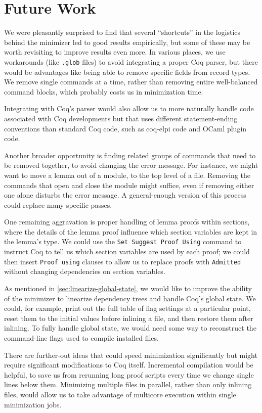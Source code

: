 \documentclass[a4paper,USenglish,cleveref,autoref,thm-restate,pdfa]{lipics-v2021}
\begin{document}
\section{Future Work}\label{sec:future-work}

We were pleasantly surprised to find that several ``shortcuts'' in the logistics behind the minimizer led to good results empirically, but some of these may be worth revisiting to improve results even more.
In various places, we use workarounds (like \texttt{.glob} files) to avoid integrating a proper Coq parser, but there would be advantages like being able to remove specific fields from record types.
We remove single commands at a time, rather than removing entire well-balanced command blocks, which probably costs us in minimization time.

Integrating with Coq's parser would also allow us to more naturally handle code associated with Coq developments but that uses different statement-ending conventions than standard Coq code, such as coq-elpi code and OCaml plugin code.

Another broader opportunity is finding related groups of commands that need to be removed together, to avoid changing the error message.
For instance, we might want to move a lemma out of a module, to the top level of a file.
Removing the commands that open and close the module might suffice, even if removing either one alone disturbs the error message.
A general-enough version of this process could replace many specific passes.

One remaining aggravation is proper handling of lemma proofs within sections, where the details of the lemma proof influence which section variables are kept in the lemma's type.
We could use the \verb|Set Suggest Proof Using| command to instruct Coq to tell us which section variables are used by each proof; we could then insert \verb|Proof using| clauses to allow us to replace proofs with \verb|Admitted| without changing dependencies on section variables.

As mentioned in \autoref{sec:linearize-global-state}, we would like to improve the ability of the minimizer to linearize dependency trees and handle Coq's global state.
We could, for example, print out the full table of flag settings at a particular point, reset them to the initial values before inlining a file, and then restore them after inlining.
To fully handle global state, we would need some way to reconstruct the command-line flags used to compile installed files.

There are further-out ideas that could speed minimization significantly but might require significant modifications to Coq itself.
Incremental compilation would be helpful, to save us from rerunning long proof scripts every time we change single lines below them.
Minimizing multiple files in parallel, rather than only inlining files, would allow us to take advantage of multicore execution within single minimization jobs.


\nocite{coqpl-15-coq-bug-minimizer}

\end{document}
